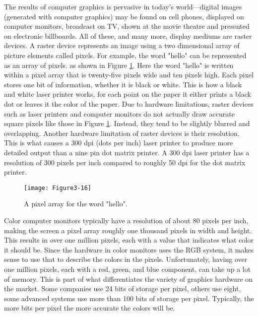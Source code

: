 The results of computer graphics is pervasive in today's world---digital images (generated with computer graphics) may be found on cell phones, displayed on computer monitors, broadcast on TV, shown at the movie theatre and presented on electronic billboards. All of these, and many more, display mediums are raster devices. A raster device represents an image using a two dimensional array of picture elements called pixels. For example, the word "hello" can be represented as an array of pixels. as shown in Figure \ref{fig:Figure3-16}. Here the word "hello" is written within a pixel array that is twenty-five pixels wide and ten pixels high. Each pixel stores one bit of information, whether it is black or white. This is how a black and white laser printer works, for each point on the paper it either prints a black dot or leaves it the color of the paper. Due to hardware limitations, raster devices such as laser printers and computer monitors do not actually draw accurate square pixels like those in Figure \ref{fig:Figure3-16}. Instead, they tend to be slightly blurred and overlapping. Another hardware limitation of raster devices is their resolution. This is what causes a 300 dpi (dots per inch) laser printer to produce more detailed output than a nine pin dot matrix printer. A 300 dpi laser printer has a resolution of 300 pixels per inch compared to roughly 50 dpi for the dot matrix printer.

\begin{figure}[!htb]
  \centering
  \texttt{[image: Figure3-16]}\\
  \caption{A pixel array for the word "hello".}\label{fig:Figure3-16}
\end{figure}

Color computer monitors typically have a resolution of about 80 pixels per inch, making the screen a pixel array roughly one thousand pixels in width and height. This results in over one million pixels, each with a value that indicates what color it should be. Since the hardware in color monitors uses the RGB system, it makes sense to use that to describe the colors in the pixels. Unfortunately, having over one million pixels, each with a red, green, and blue component, can take up a lot of memory. This is part of what differentiates the variety of graphics hardware on the market. Some companies use 24 bits of storage per pixel, others use eight, some advanced systems use more than 100 bits of storage per pixel. Typically, the more bits per pixel the more accurate the colors will be.

